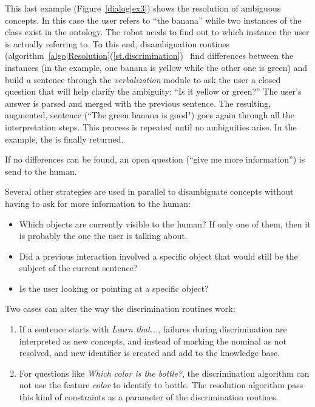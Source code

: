 This last example (Figure~\ref{dialog|ex3}) shows the resolution of ambiguous
concepts. In this case the user refers to ``the banana'' while two instances of
the  class exist in the ontology. The robot needs to find out
to which instance the user is actually referring to. To this end,
disambiguation routines
(algorithm~\ref{algo|Resolution}(\ref{st.discrimination})~\cite{Ros2010b}
 find differences between the
instances (in the example, one banana is yellow while the other one is green)
and build a sentence through the \emph{verbalization} module to ask the user a
closed question that will help clarify the ambiguity: ``Is it yellow or
green?'' The user's answer is parsed and merged with the previous sentence. The
resulting, augmented, sentence (``The green banana is good") goes again through
all the interpretation steps. This process is repeated until no ambiguities
arise.  In the example, the  is finally returned.

If no differences  can be found, an open question 
(``give me more information'') is send to the human.

Several other strategies are used in parallel to disambiguate concepts without
having to ask for more information to the human:

\begin{itemize}
	\item Which objects are currently visible to the human? If only one of
	them, then it is probably the one the user is talking about. 
	\item Did a previous interaction involved a specific object that would
	still be the subject of the current sentence?
	\item Is the user looking or pointing at a specific object?
\end{itemize}

Two cases can alter the way the discrimination routines work:
\begin{enumerate}
    \item If a sentence starts with {\it Learn that...}, failures during 
    discrimination are interpreted as new concepts, and instead of marking the 
    nominal as not resolved, and new identifier is created and add to the knowledge base.
    \item For questions like {\it Which color is the bottle?}, the discrimination 
    algorithm can not use the feature {\it color} to identify to bottle. The 
    resolution algorithm pass this kind of constraints as a parameter of the 
    discrimination routines.
\end{enumerate}

